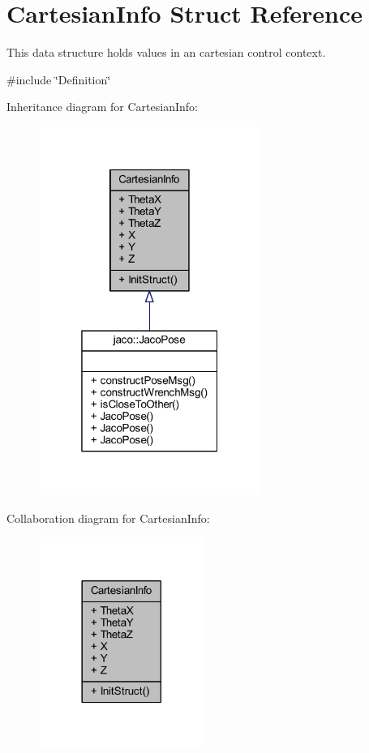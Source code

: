 \hypertarget{structCartesianInfo}{}\section{Cartesian\+Info Struct Reference}
\label{structCartesianInfo}


This data structure holds values in an cartesian control context.  




{\ttfamily \#include \char`\"{}Definition\char`\"{}}



Inheritance diagram for Cartesian\+Info\+:
\nopagebreak
\begin{figure}[H]
\begin{center}
\leavevmode
\includegraphics[width=205pt]{dc/d2e/structCartesianInfo__inherit__graph}
\end{center}
\end{figure}


Collaboration diagram for Cartesian\+Info\+:
\nopagebreak
\begin{figure}[H]
\begin{center}
\leavevmode
\includegraphics[width=153pt]{d2/d3b/structCartesianInfo__coll__graph}
\end{center}
\end{figure}

